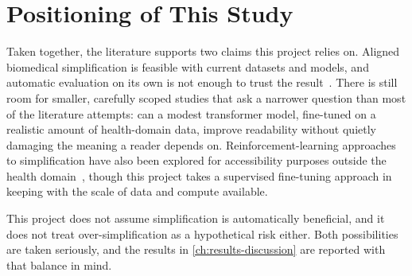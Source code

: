\section{Positioning of This Study}
\label{sec:positioning}

Taken together, the literature supports two claims this project relies on. Aligned biomedical simplification is feasible with current datasets and models, and automatic evaluation on its own is not enough to trust the result~\cite{bakker2024cochraneauto,alvamanchego2020asset,jiang2020wikiauto}. There is still room for smaller, carefully scoped studies that ask a narrower question than most of the literature attempts: can a modest transformer model, fine-tuned on a realistic amount of health-domain data, improve readability without quietly damaging the meaning a reader depends on. Reinforcement-learning approaches to simplification have also been explored for accessibility purposes outside the health domain~\cite{baggio2025rl}, though this project takes a supervised fine-tuning approach in keeping with the scale of data and compute available.

This project does not assume simplification is automatically beneficial, and it does not treat over-simplification as a hypothetical risk either. Both possibilities are taken seriously, and the results in \cref{ch:results-discussion} are reported with that balance in mind.
